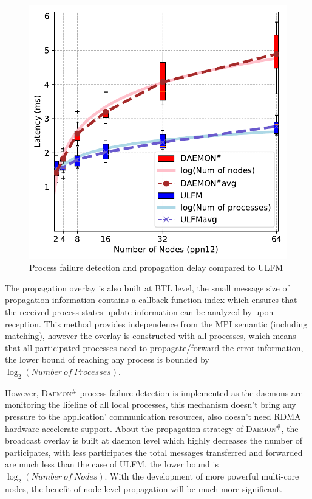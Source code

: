 \documentclass[sigconf]{acmart}
\newcommand{\ulfm}[0]{\textsc{ULFM}\xspace}
\newcommand{\mpi}[0]{\textsc{MPI}\xspace}
\newcommand{\ourwork}[0]{\textsc{Daemon}\ensuremath{^\#}\xspace}
\begin{document}
\begin{figure}[h]
  \centering
  \includegraphics[width=\linewidth]{Process_Failure_log_fit.pdf}
  \caption{Process failure detection and propagation delay compared to \ulfm}
  \label{fig:proc_failure_nacl}
\end{figure}

The propagation overlay is also built at BTL level, the small message size of propagation information contains a callback function index which ensures that the received process states update information can be analyzed by upon reception. This method provides independence from the \mpi semantic (including matching), however the overlay is constructed with all processes, which means that all participated processes need to propagate/forward the error information, the lower bound of reaching any process is bounded by $\log_2({Number\ of\ Processes})$.  

However, \ourwork process failure detection is implemented as the daemons are monitoring the lifeline of all local processes, this mechanism doesn't bring any pressure to the application' communication resources, also doesn't need RDMA hardware accelerate support. About the propagation strategy of \ourwork, the broadcast overlay is built at daemon level which highly decreases the number of participates, with less participates the total messages transferred and forwarded are much less than the case of \ulfm, the lower bound is $\log_2({Number\ of\ Nodes})$. With the development of more powerful multi-core nodes, the benefit of node level propagation will be much more significant.
\end{document}
